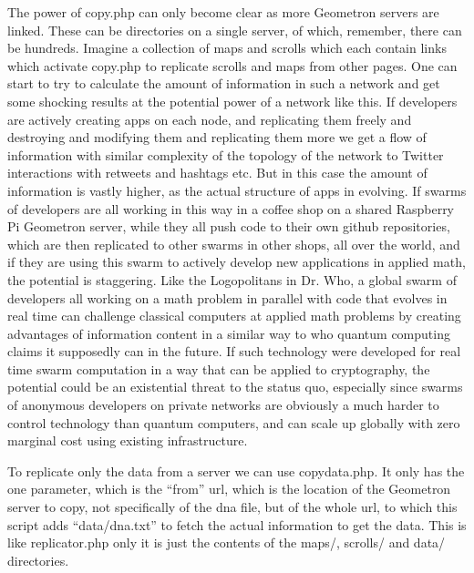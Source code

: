 The power of copy.php can only become clear as more Geometron servers are linked.  These can be directories on a single server, of which, remember, there can be hundreds.  Imagine a collection of maps and scrolls which each contain links which activate copy.php to replicate scrolls and maps from other pages.  One can start to try to calculate the amount of information in such a network and get some shocking results at the potential power of a network like this.  If developers are actively creating apps on each node, and replicating them freely and destroying and modifying them and replicating them more we get a flow of information with similar complexity of the topology of the network to Twitter interactions with retweets and hashtags etc.  But in this case the amount of information is vastly higher, as the actual structure of apps in evolving.  If swarms of developers are all working in this way in a coffee shop on a shared Raspberry Pi Geometron server, while they all push code to their own github repositories, which are then replicated to other swarms in other shops, all over the world, and if they are using this swarm to actively develop new applications in applied math, the potential is staggering.  Like the Logopolitans in Dr. Who, a global swarm of developers all working on a math problem in parallel with code that evolves in real time can challenge classical computers at applied math problems by creating advantages of information content in a similar way to who quantum computing claims it supposedly can in the future.  If such technology were developed for real time swarm computation in a way that can be applied to cryptography, the potential could be an existential threat to the status quo, especially since swarms of anonymous developers on private networks are obviously a much harder to control technology than quantum computers, and can scale up globally with zero marginal cost using existing infrastructure.

To replicate only the data from a server we can use copydata.php.  It only has the one parameter, which is the ``from'' url, which is the location of the Geometron server to copy, not specifically of the dna file, but of the whole url, to which this script adds ``data/dna.txt'' to fetch the actual information to get the data.  This is like replicator.php only it is just the contents of the maps/, scrolls/ and data/ directories.   

